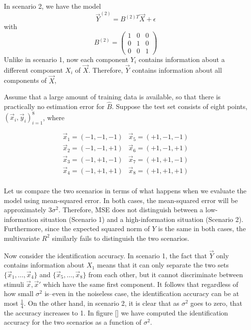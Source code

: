 In scenario 2, we have the model
\[
\vec{Y}^{(2)} = B^{(2)T} \vec{X} + \epsilon
\]
with
\[
B^{(2)} = \begin{pmatrix}
1 & 0 & 0\\
0 & 1 & 0\\
0 & 0 & 1
\end{pmatrix}
\]
Unlike in scenario 1, now each component $Y_i$ contains information
about a different component $X_i$ of $\vec{X}$.  Therefore, $\vec{Y}$
contains information about all components of $\vec{X}$,

Assume that a large amount of training data is available, so that
there is practically no estimation error for $\hat{B}$.  Suppose the
test set consists of eight points, $(\vec{x}_i, \vec{y}_i)_{i=1}^8$,
where

\[
\begin{matrix}
\vec{x}_1 = (-1, -1, -1) &
\vec{x}_5 = (+1, -1, -1) \\
\vec{x}_2 = (-1, -1, +1) &
\vec{x}_6 = (+1, -1, +1) \\
\vec{x}_3 = (-1, +1, -1) &
\vec{x}_7 = (+1, +1, -1) \\
\vec{x}_4 = (-1, +1, +1) & 
\vec{x}_8 = (+1, +1, +1) \\
\end{matrix}
\]

Let us compare the two scenarios in terms of what happens when we
evaluate the model using mean-squared error.  In both cases, the
mean-squared error will be approximately $3\sigma^2$.  Therefore, MSE
does not distinguish between a low-information situation (Scenario 1)
and a high-information situation (Scenario 2).  Furthermore, since the
expected squared norm of $Y$ is the same in both cases, the
multivariate $R^2$ similarly fails to distinguish the two scenarios.

Now consider the identification accuracy.  In scenario 1, the fact
that $\vec{Y}$ only contains information about $X_1$ means that it can
only separate the two sets $\{\vec{x}_1,\hdots, \vec{x}_4\}$ and
$\{\vec{x}_5,\hdots, \vec{x}_8\}$ from each other, but it cannot
discriminate between stimuli $\vec{x}, \vec{x}'$ which have the same
first component.  It follows that regardless of how small $\sigma^2$
is--even in the noiseless case, the identification accuracy can be at
most $\frac{1}{4}$.  On the other hand, in scenario 2, it is clear
that as $\sigma^2$ goes to zero, that the accuracy increases to 1.  In
figure [] we have computed the identification accuracy for the two
scenarios as a function of $\sigma^2$.


